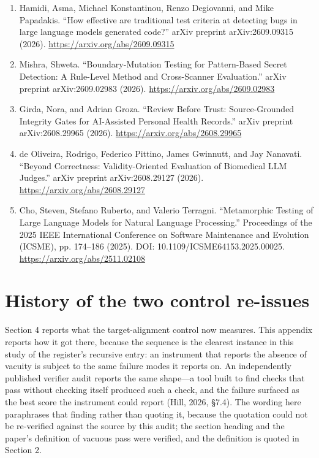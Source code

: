 \documentclass[11pt]{article}
\begin{document}
\begin{enumerate}[leftmargin=*]
\item Hamidi, Asma, Michael Konstantinou, Renzo Degiovanni, and Mike Papadakis. ``How effective are traditional test criteria at detecting bugs in large language models generated code?'' arXiv preprint arXiv:2609.09315 (2026). \url{https://arxiv.org/abs/2609.09315}
\item Mishra, Shweta. ``Boundary-Mutation Testing for Pattern-Based Secret Detection: A Rule-Level Method and Cross-Scanner Evaluation.'' arXiv preprint arXiv:2609.02983 (2026). \url{https://arxiv.org/abs/2609.02983}
\item Girda, Nora, and Adrian Groza. ``Review Before Trust: Source-Grounded Integrity Gates for AI-Assisted Personal Health Records.'' arXiv preprint arXiv:2608.29965 (2026). \url{https://arxiv.org/abs/2608.29965}
\item de Oliveira, Rodrigo, Federico Pittino, James Gwinnutt, and Jay Nanavati. ``Beyond Correctness: Validity-Oriented Evaluation of Biomedical LLM Judges.'' arXiv preprint arXiv:2608.29127 (2026). \url{https://arxiv.org/abs/2608.29127}
\item Cho, Steven, Stefano Ruberto, and Valerio Terragni. ``Metamorphic Testing of Large Language Models for Natural Language Processing.'' Proceedings of the 2025 IEEE International Conference on Software Maintenance and Evolution (ICSME), pp. 174--186 (2025). DOI: 10.1109/ICSME64153.2025.00025. \url{https://arxiv.org/abs/2511.02108}
\end{enumerate}
\appendix
\section{History of the two control re-issues}
\label{app:reissue-history}
Section 4 reports what the target-alignment control now measures. This appendix reports how it got there, because the sequence is the clearest instance in this study of the register's recursive entry: an instrument that reports the absence of vacuity is subject to the same failure modes it reports on. An independently published verifier audit reports the same shape---a tool built to find checks that pass without checking itself produced such a check, and the failure surfaced as the best score the instrument could report (Hill, 2026, \S7.4). The wording here paraphrases that finding rather than quoting it, because the quotation could not be re-verified against the source by this audit; the section heading and the paper's definition of vacuous pass were verified, and the definition is quoted in Section 2.
\end{document}
